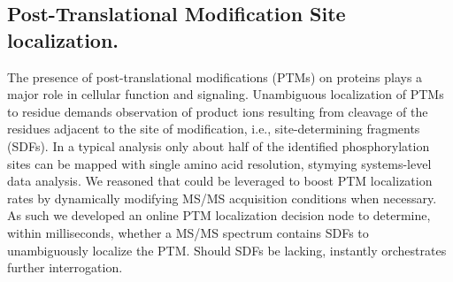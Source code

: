 \subsection*{Post-Translational Modification Site localization.}

The presence of post-translational modifications (PTMs) on proteins plays a major role in cellular function and signaling. Unambiguous localization of PTMs to residue demands observation of product ions resulting from cleavage of the residues adjacent to the site of modification, i.e., site-determining fragments (SDFs). In a typical analysis only about half of the identified phosphorylation sites can be mapped with single amino acid resolution, stymying systems-level data analysis. We reasoned that \inseq{} could be leveraged to boost PTM localization rates by dynamically modifying MS/MS acquisition conditions when necessary. As such we developed an online PTM localization decision node to determine, within milliseconds, whether a MS/MS spectrum contains SDFs to unambiguously localize the PTM. Should SDFs be lacking, \inseq{} instantly orchestrates further interrogation.


